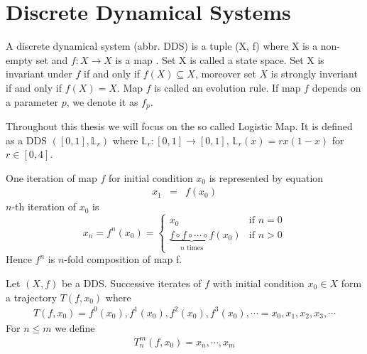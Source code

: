 \section{Discrete Dynamical Systems}

\begin{definition}
    A discrete dynamical system (abbr. DDS) is a tuple (X, f) where X is a non-empty set and $f: X \rightarrow X$ is a map \cite{Brin20100706}.
    Set X is called a state space.
    Set X is invariant under $f$ if and only if $f(X) \subseteq X$, moreover set $X$ is strongly inveriant if and only if $f(X) = X$.
    Map $f$ is called an evolution rule. 
    If map $f$ depends on a parameter $p$, we denote it as $f_p$.
\end{definition}

\begin{example}
   Throughout this thesis we will focus on the so called Logistic Map. 
   It is defined as a DDS $([0, 1], \mathbb{L}_{r})$ where $\mathbb{L}_{r}: [0,1] \rightarrow [0,1]$, $\mathbb{L}_{r}(x) = rx(1-x)$ for $r \in [0, 4]$.
\end{example}

\begin{definition}[n-th iteration]
    One iteration of map $f$ for initial condition $x_0$ is represented by equation
    \begin{eqnarray}
        x_{1}  & = & f(x_{0})
    \end{eqnarray}
    $n$-th iteration of $x_0$ is
    \begin{equation}
    x_{n} = f^{n}(x_0) =
        \begin{cases}
            x_0 & \text{if } n = 0\\
            \underbrace{f \circ f \circ \cdots \circ f}_\text{$n$ times}(x_0) & \text{if } n > 0 
        \end{cases}
    \end{equation}
    Hence $f^{n}$ is $n$-fold composition of map f.
\end{definition}


\begin{definition}[Trajectory]
    Let $(X, f)$ be a DDS. Successive iterates of $f$ with initial condition $x_0 \in X$ form a trajectory $T(f, x_0)$ where
    \begin{eqnarray}
        T(f, x_0) = f^0(x_0), f^1(x_0), f^2(x_0), f^3(x_0), \cdots  = x_0, x_1, x_2, x_3, \cdots
    \end{eqnarray}
    For $n \leq m$ we define
    \begin{eqnarray}
        T_{n}^{m}(f, x_0) = x_n, \cdots, x_m
    \end{eqnarray}
\end{definition}

